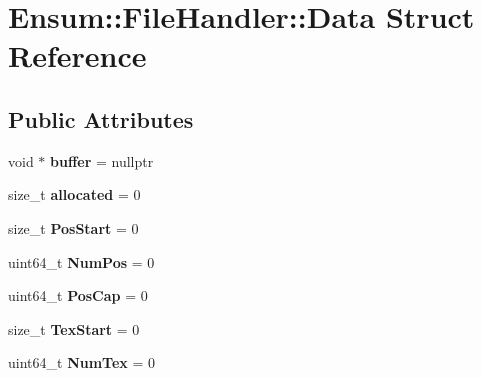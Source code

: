 \hypertarget{struct_ensum_1_1_file_handler_1_1_data}{}\section{Ensum\+:\+:File\+Handler\+:\+:Data Struct Reference}
\label{struct_ensum_1_1_file_handler_1_1_data}
\subsection*{Public Attributes}
\begin{DoxyCompactItemize}
\item 
void $\ast$ {\bfseries buffer} = nullptr\hypertarget{struct_ensum_1_1_file_handler_1_1_data_a9452d399909851b8319ee43803c74657}{}\label{struct_ensum_1_1_file_handler_1_1_data_a9452d399909851b8319ee43803c74657}

\item 
size\+\_\+t {\bfseries allocated} = 0\hypertarget{struct_ensum_1_1_file_handler_1_1_data_aea6b1588f9c075b6c43b06deaed222d5}{}\label{struct_ensum_1_1_file_handler_1_1_data_aea6b1588f9c075b6c43b06deaed222d5}

\item 
size\+\_\+t {\bfseries Pos\+Start} = 0\hypertarget{struct_ensum_1_1_file_handler_1_1_data_a6f9e2ec301034bb6d9e2aed3415040f5}{}\label{struct_ensum_1_1_file_handler_1_1_data_a6f9e2ec301034bb6d9e2aed3415040f5}

\item 
uint64\+\_\+t {\bfseries Num\+Pos} = 0\hypertarget{struct_ensum_1_1_file_handler_1_1_data_a91e218f10b41b2a21c28c7766bc018af}{}\label{struct_ensum_1_1_file_handler_1_1_data_a91e218f10b41b2a21c28c7766bc018af}

\item 
uint64\+\_\+t {\bfseries Pos\+Cap} = 0\hypertarget{struct_ensum_1_1_file_handler_1_1_data_a99bd2c21fe0c278a1b82ed8d0e173ca5}{}\label{struct_ensum_1_1_file_handler_1_1_data_a99bd2c21fe0c278a1b82ed8d0e173ca5}

\item 
size\+\_\+t {\bfseries Tex\+Start} = 0\hypertarget{struct_ensum_1_1_file_handler_1_1_data_a864496650fb281a7c91858ceda67d5f8}{}\label{struct_ensum_1_1_file_handler_1_1_data_a864496650fb281a7c91858ceda67d5f8}

\item 
uint64\+\_\+t {\bfseries Num\+Tex} = 0\hypertarget{struct_ensum_1_1_file_handler_1_1_data_ac60a94b1d3b849abb64f510965494e3b}{}\label{struct_ensum_1_1_file_handler_1_1_data_ac60a94b1d3b849abb64f510965494e3b}


\end{DoxyCompactItemize}
